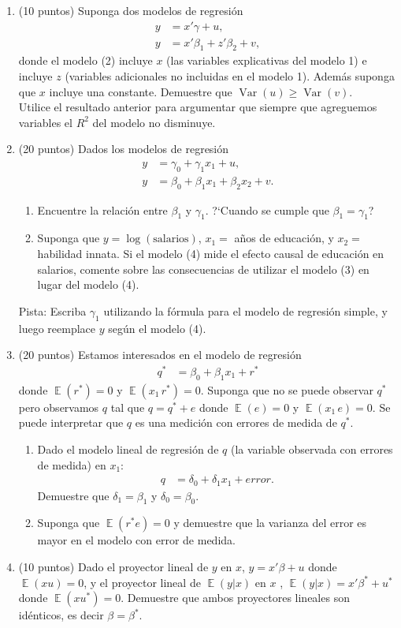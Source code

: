 \documentclass[letterpaper,11pt]{article}
\theoremstyle{plain}
\theoremstyle{definition}
\theoremstyle{remark}
\DeclareMathOperator{\Var}{Var}
\DeclareMathOperator{\E}{\mathbb{E}}
\begin{document}
\begin{enumerate}
    \item (10 puntos) Suponga dos modelos de regresi\'on 
    \begin{align}
    y &= x'\gamma+u,\\
    y &= x'\beta_1+z'\beta_2+v,
    \end{align}
    donde el modelo (2) incluye $x$ (las variables explicativas del modelo 1) e incluye $z$ (variables adicionales no incluidas en el modelo 1). Adem\'as suponga que $x$ incluye una constante. Demuestre que $\Var(u)\geq \Var(v)$.\\
    Utilice el resultado anterior para argumentar que siempre que agreguemos variables el $R^2$ del modelo no disminuye.
    \item (20 puntos) Dados los modelos de regresi\'on 
    \begin{align}
        y &= \gamma_0+\gamma_1 x_{1}+u,\\
        y &= \beta_0 + \beta_1 x_{1}+\beta_2 x_{2}+v.
    \end{align}
    \begin{enumerate}
        \item Encuentre la relaci\'on entre $\beta_1$ y $\gamma_1$. ?`Cuando se cumple que $\beta_1=\gamma_1$?
        \item Suponga que $y = \log(\text{salarios})$, $x_{1}=$ a\~nos de educaci\'on, y $x_{2}=$ habilidad innata. Si el modelo (4) mide el efecto causal de educaci\'on en salarios, comente sobre las consecuencias de utilizar el modelo (3) en lugar del modelo (4).
    \end{enumerate}
    Pista: Escriba $\gamma_1$ utilizando la f\'ormula para el modelo de regresi\'on simple, y luego reemplace $y$ seg\'un el modelo (4).
    \item (20 puntos) Estamos interesados en el modelo de regresi\'on 
    \begin{align*}
        q^* &= \beta_0 + \beta_1 x_{1}+r^*
    \end{align*}
    donde $\E(r^*)=0$ y $\E(x_1\,r^*)=0$.
    Suponga que no se puede observar $q^*$ pero observamos $q$ tal que $q=q^*+e$ donde $\E(e)=0$ y $\E(x_1\,e)=0$. Se puede interpretar que $q$ es una medici\'on con errores de medida de $q^*$.
    \begin{enumerate}
        \item Dado el modelo lineal de regresi\'on de $q$ (la variable observada con errores de medida) en $x_1$: 
    \begin{align*}
        q &= \delta_0 + \delta_1 x_{1}+error.
    \end{align*}
        Demuestre que $\delta_1=\beta_1$ y $\delta_0=\beta_0$.
        \item Suponga que $\E(r^* e)=0$ y demuestre que la varianza del error es mayor en el modelo con error de medida.\\
    \end{enumerate}
    \item (10 puntos) Dado el proyector lineal de $y$ en $x$, $y=x'\beta+u$ donde $\E(xu)=0$, y el proyector lineal de $\E(y|x)$ en $x$ , $\E(y|x)=x'\beta^*+u^*$ donde $\E(xu^*)=0$. Demuestre que ambos proyectores lineales son id\'enticos, es decir $\beta = \beta^*$.
\end{enumerate}
\end{document}
